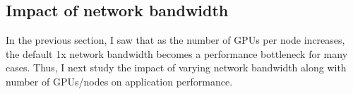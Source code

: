 %

\subsection{Impact of network bandwidth}

In the previous section, I saw that as the number of GPUs per node increases, 
the default 1x network bandwidth becomes a performance bottleneck for many
cases.  Thus, I next study the impact of varying network bandwidth along with number of
GPUs/nodes on application performance. 

